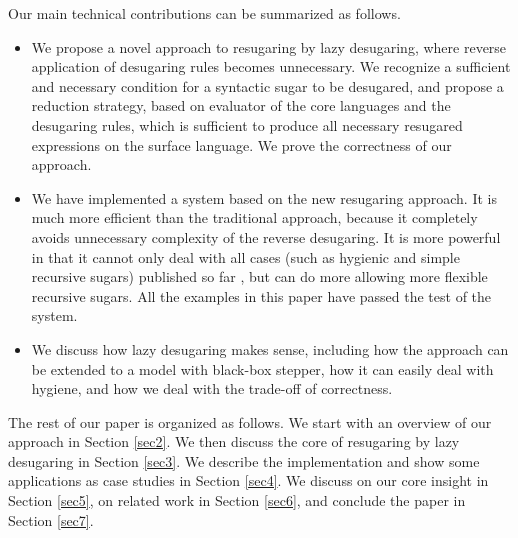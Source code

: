 Our main technical contributions can be summarized as follows.
\begin{itemize}
\item We propose a novel approach to resugaring by lazy desugaring, where reverse application of desugaring rules becomes unnecessary. We recognize a sufficient and necessary condition for a syntactic sugar to be desugared, and propose a reduction strategy, based on evaluator of the core languages and the desugaring rules, which is sufficient to produce all necessary resugared expressions on the surface language. We prove the correctness of our approach.

\item We have implemented a system based on the new resugaring approach. It is much more efficient than the traditional approach, because it completely avoids unnecessary complexity of the reverse desugaring. It is more powerful in that it cannot only deal with all cases (such as hygienic and simple recursive sugars) published so far \cite{resugaring,hygienic}, but can do more allowing more flexible recursive sugars. All the examples in this paper have passed the test of the system.

\item We discuss how lazy desugaring makes sense, including how the approach can be extended to a model with black-box stepper, how it can easily deal with hygiene, and how we deal with the trade-off of correctness.


\end{itemize}

The rest of our paper is organized as follows. We start with an overview of our approach in Section \ref{sec2}. We then discuss the core of resugaring by lazy desugaring in Section \ref{sec3}. We describe the implementation and show some applications as case studies in Section \ref{sec4}. We discuss on our core insight in Section \ref{sec5}, on related work in Section \ref{sec6}, and conclude the paper in Section \ref{sec7}.
